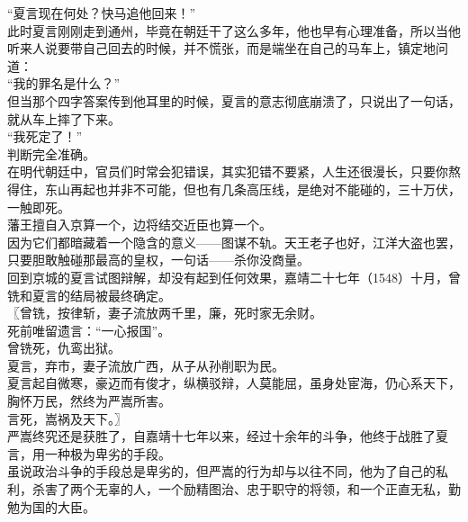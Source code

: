 \begin{multicols}{\theparacolNo}
“夏言现在何处？快马追他回来！”\\

此时夏言刚刚走到通州，毕竟在朝廷干了这么多年，他也早有心理准备，所以当他听来人说要带自己回去的时候，并不慌张，而是端坐在自己的马车上，镇定地问道：\\

“我的罪名是什么？”\\

但当那个四字答案传到他耳里的时候，夏言的意志彻底崩溃了，只说出了一句话，就从车上摔了下来。\\

“我死定了！”\\

判断完全准确。\\

在明代朝廷中，官员们时常会犯错误，其实犯错不要紧，人生还很漫长，只要你熬得住，东山再起也并非不可能，但也有几条高压线，是绝对不能碰的，三十万伏，一触即死。\\

藩王擅自入京算一个，边将结交近臣也算一个。\\

因为它们都暗藏着一个隐含的意义——图谋不轨。天王老子也好，江洋大盗也罢，只要胆敢触碰那最高的皇权，一句话——杀你没商量。\\

回到京城的夏言试图辩解，却没有起到任何效果，嘉靖二十七年（1548）十月，曾铣和夏言的结局被最终确定。\\

〖曾铣，按律斩，妻子流放两千里，廉，死时家无余财。\\

死前唯留遗言：“一心报国”。\\

曾铣死，仇鸾出狱。\\

夏言，弃市，妻子流放广西，从子从孙削职为民。\\

夏言起自微寒，豪迈而有俊才，纵横驳辩，人莫能屈，虽身处宦海，仍心系天下，胸怀万民，然终为严嵩所害。\\

言死，嵩祸及天下。〗\\

严嵩终究还是获胜了，自嘉靖十七年以来，经过十余年的斗争，他终于战胜了夏言，用一种极为卑劣的手段。\\

虽说政治斗争的手段总是卑劣的，但严嵩的行为却与以往不同，他为了自己的私利，杀害了两个无辜的人，一个励精图治、忠于职守的将领，和一个正直无私，勤勉为国的大臣。\\


\end{multicols}
